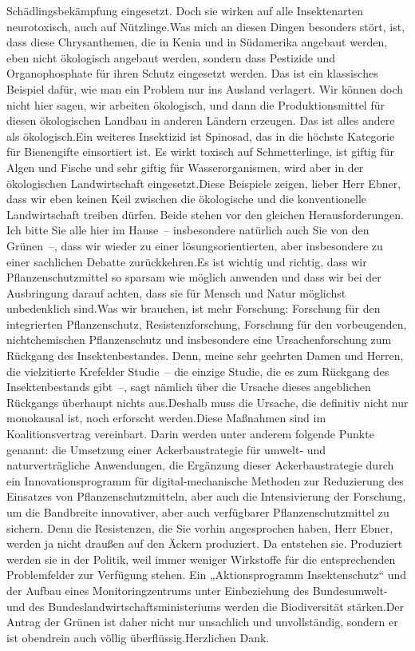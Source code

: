\documentclass{article}
\begin{document}
Schädlingsbekämpfung eingesetzt. Doch sie wirken auf alle Insektenarten neurotoxisch, auch auf Nützlinge.Was mich an diesen Dingen besonders stört, ist, dass diese Chrysanthemen, die in Kenia und in Südamerika angebaut werden, eben nicht ökologisch angebaut werden, sondern dass Pestizide und Organophosphate für ihren Schutz eingesetzt werden. Das ist ein klassisches Beispiel dafür, wie man ein Problem nur ins Ausland verlagert. Wir können doch nicht hier sagen, wir arbeiten ökologisch, und dann die Produktionsmittel für diesen ökologischen Landbau in anderen Ländern erzeugen. Das ist alles andere als ökologisch.Ein weiteres Insektizid ist Spinosad, das in die höchste Kategorie für Bienengifte einsortiert ist. Es wirkt toxisch auf Schmetterlinge, ist giftig für Algen und Fische und sehr giftig für Wasserorganismen, wird aber in der ökologischen Landwirtschaft eingesetzt.Diese Beispiele zeigen, lieber Herr Ebner, dass wir eben keinen Keil zwischen die ökologische und die konventionelle Landwirtschaft treiben dürfen. Beide stehen vor den gleichen Herausforderungen. Ich bitte Sie alle hier im Hause – insbesondere natürlich auch Sie von den Grünen –, dass wir wieder zu einer lösungsorientierten, aber insbesondere zu einer sachlichen Debatte zurückkehren.Es ist wichtig und richtig, dass wir Pflanzenschutzmittel so sparsam wie möglich anwenden und dass wir bei der Ausbringung darauf achten, dass sie für Mensch und Natur möglichst unbedenklich sind.Was wir brauchen, ist mehr Forschung: Forschung für den integrierten Pflanzenschutz, Resistenzforschung, Forschung für den vorbeugenden, nichtchemischen Pflanzenschutz und insbesondere eine Ursachenforschung zum Rückgang des Insektenbestandes. Denn, meine sehr geehrten Damen und Herren, die vielzitierte Krefelder Studie – die einzige Studie, die es zum Rückgang des Insektenbestands gibt –, sagt nämlich über die Ursache dieses angeblichen Rückgangs überhaupt nichts aus.Deshalb muss die Ursache, die definitiv nicht nur monokausal ist, noch erforscht werden.Diese Maßnahmen sind im Koalitionsvertrag vereinbart. Darin werden unter anderem folgende Punkte genannt: die Umsetzung einer Ackerbaustrategie für umwelt- und naturverträgliche Anwendungen, die Ergänzung dieser Ackerbaustrategie durch ein Innovationsprogramm für digital-mechanische Methoden zur Reduzierung des Einsatzes von Pflanzenschutzmitteln, aber auch die Intensivierung der Forschung, um die Bandbreite innovativer, aber auch verfügbarer Pflanzenschutzmittel zu sichern. Denn die Resistenzen, die Sie vorhin angesprochen haben, Herr Ebner, werden ja nicht draußen auf den Äckern produziert. Da entstehen sie. Produziert werden sie in der Politik, weil immer weniger Wirkstoffe für die entsprechenden Problemfelder zur Verfügung stehen. Ein „Aktionsprogramm Insektenschutz“ und der Aufbau eines Monitoringzentrums unter Einbeziehung des Bundesumwelt- und des Bundeslandwirtschaftsministeriums werden die Biodiversität stärken.Der Antrag der Grünen ist daher nicht nur unsachlich und unvollständig, sondern er ist obendrein auch völlig überflüssig.Herzlichen Dank.
\end{document}
